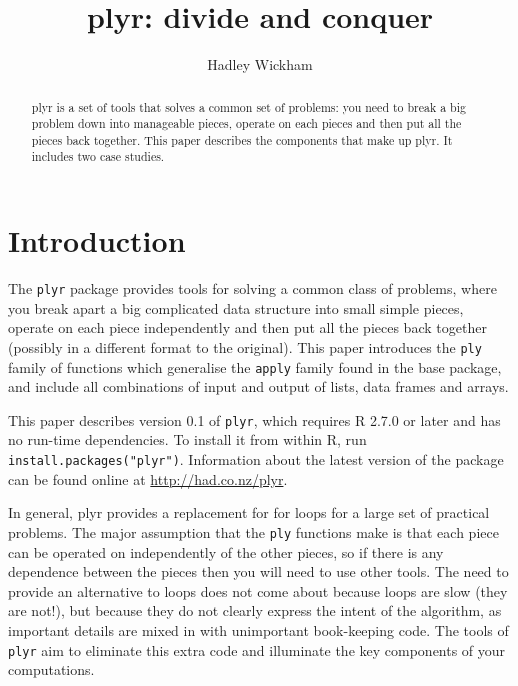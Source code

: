 \documentclass[letterpage]{scrartcl}
\title{plyr: divide and conquer}
\author{Hadley Wickham}
\begin{document}
\maketitle

%


\begin{abstract}
plyr is a set of tools that solves a common set of problems: you need to break a big problem down into manageable pieces, operate on each pieces and then put all the pieces back together.  This paper describes the components that make up plyr.  It includes two case studies.
\end{abstract}

\section{Introduction}

The {\tt plyr} package provides tools for solving a common class of problems, where you break apart a big complicated data structure into small simple pieces, operate on each piece independently and then put all the pieces back together (possibly in a different format to the original).  This paper introduces the {\tt ply} family of functions which generalise the {\tt apply} family found in the base package, and include all combinations of input and output of lists, data frames and arrays.

This paper describes version 0.1 of {\tt plyr}, which requires R 2.7.0 or later and has no run-time dependencies.  To install it from within R, run {\tt install.packages("plyr")}.  Information about the latest version of the package can be found online at \url{http://had.co.nz/plyr}.  


In general, plyr provides a replacement for for loops for a large set of practical problems.  The major assumption that the {\tt ply} functions make is that each piece can be operated on independently of the other pieces, so if there is any dependence between the pieces then you will need to use other tools.  The need to provide an alternative to loops does not come about because loops are slow (they are not!), but because they do not clearly express the intent of the algorithm, as important details are mixed in with unimportant book-keeping code. The tools of {\tt plyr} aim to eliminate this extra code and illuminate the key components of your computations.
\end{document}
